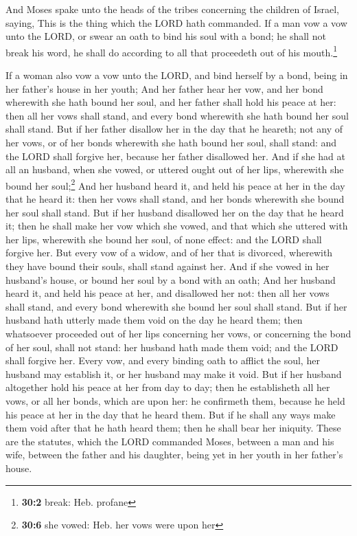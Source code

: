  And Moses spake unto the heads of the tribes concerning
the children of Israel, saying, This is the thing which the LORD hath
commanded.  If a man vow a vow unto the LORD, or swear an
oath to bind his soul with a bond; he shall not break his word, he shall
do according to all that proceedeth out of his mouth.\footnote{\textbf{30:2}
  break: Heb. profane}

 If a woman also vow a vow unto the LORD, and bind herself
by a bond, being in her father's house in her youth;  And
her father hear her vow, and her bond wherewith she hath bound her soul,
and her father shall hold his peace at her: then all her vows shall
stand, and every bond wherewith she hath bound her soul shall stand.
 But if her father disallow her in the day that he
heareth; not any of her vows, or of her bonds wherewith she hath bound
her soul, shall stand: and the LORD shall forgive her, because her
father disallowed her.  And if she had at all an husband,
when she vowed, or uttered ought out of her lips, wherewith she bound
her soul;\footnote{\textbf{30:6} she vowed: Heb. her vows were upon her}
 And her husband heard it, and held his peace at her in
the day that he heard it: then her vows shall stand, and her bonds
wherewith she bound her soul shall stand.  But if her
husband disallowed her on the day that he heard it; then he shall make
her vow which she vowed, and that which she uttered with her lips,
wherewith she bound her soul, of none effect: and the LORD shall forgive
her.  But every vow of a widow, and of her that is
divorced, wherewith they have bound their souls, shall stand against
her.  And if she vowed in her husband's house, or bound
her soul by a bond with an oath;  And her husband heard
it, and held his peace at her, and disallowed her not: then all her vows
shall stand, and every bond wherewith she bound her soul shall stand.
 But if her husband hath utterly made them void on the
day he heard them; then whatsoever proceeded out of her lips concerning
her vows, or concerning the bond of her soul, shall not stand: her
husband hath made them void; and the LORD shall forgive her.
 Every vow, and every binding oath to afflict the soul,
her husband may establish it, or her husband may make it void.
 But if her husband altogether hold his peace at her from
day to day; then he establisheth all her vows, or all her bonds, which
are upon her: he confirmeth them, because he held his peace at her in
the day that he heard them.  But if he shall any ways
make them void after that he hath heard them; then he shall bear her
iniquity.  These are the statutes, which the LORD
commanded Moses, between a man and his wife, between the father and his
daughter, being yet in her youth in her father's house.

